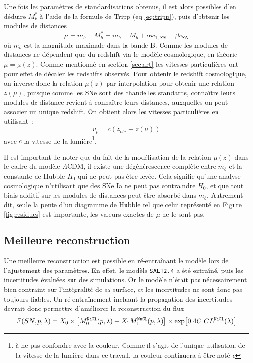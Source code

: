 \documentclass{book}
\def\nacl{\texttt{NaCl}\xspace}
\def\saltd{\texttt{SALT2.4}\xspace}
\begin{document}
Une fois les paramètres de standardisations obtenus, il est alors possibles d'en déduire $M_b^*$ à l'aide de la formule de Tripp (eq \ref{eq:tripp}), puis d'obtenir les modules de distances
\begin{equation}
    \mu = m_b - M_b^* = m_b - M_b + \alpha x_{1, SN} - \beta c_{SN}
\end{equation}
où $m_b$ est la magnitude maximale dans la bande B.
Comme les modules de distances ne dépendent que du redshift via le modèle cosmologique, en théorie $\mu = \mu(z)$. Comme mentionné en section \ref{sec:art} les vitesses particulières ont pour effet de décaler les redshifts observés. Pour obtenir le redshift cosmologique, on inverse donc la relation $\mu(z)$ par interpolation pour obtenir une relation $z(\mu)$, puisque comme les SNe sont des chandelles standards, connaître leurs modules de distance revient à connaître leurs distances, auxquelles on peut associer un unique redshift. On obtient alors les vitesses particulières en utilisant~:
\begin{equation}
    v_p = c (z_{obs} - z(\mu))
\end{equation}
avec $c$ la vitesse de la lumière\footnote{à ne pas confondre avec la couleur. Comme il s'agit de l'unique utilisation de la vitesse de la lumière dans ce travail, la couleur continuera à être noté $c$}.

Il est important de noter que du fait de la modélisation de la relation $\mu(z)$ dans le cadre du modèle $\Lambda$CDM, il existe une dégénérescence complète entre $m_b$ et la constante de Hubble $H_0$ qui ne peut pas être levée. Cela signifie qu'une analyse cosmologique n'utilisant que des SNe Ia ne peut pas contraindre $H_0$, et que tout biais additif sur les modules de distances peut-être absorbé dans $m_b$. Autrement dit, seule la pente d'un diagramme de Hubble tel que celui représenté en Figure \ref{fig;residues} est importante, les valeurs exactes de $\mu$ ne le sont pas.

\subsection{Meilleure reconstruction}

Une meilleure reconstruction est possible en ré-entraînant le modèle lors de l'ajustement des paramètres. En effet, le modèle \saltd a été entraîné, puis les incertitudes évaluées sur des simulations. Or le modèle n'était pas nécessairement bien contraint sur l'intégralité de sa surface, et les incertitudes ne sont donc pas toujours fiables. Un ré-entraînement incluant la propagation des incertitudes devrait donc permettre d'améliorer la reconstruction du flux
\begin{equation}
    F(SN, p, \lambda) = X_0 \times \qty[M^{\nacl}_0(p, \lambda) + X_1 M^{\nacl}_1(p, \lambda)] \times \exp[0.4 C\  CL^{\nacl}(\lambda)]
\end{equation}
\end{document}
